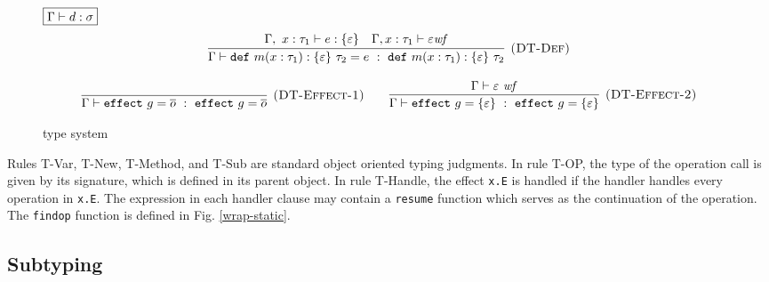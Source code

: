 \documentclass{article}
\newcommand{\keywadj}[1]{\mathtt{#1}}
\newcommand{\keyw}[1]{\keywadj{#1}~}
\begin{document}
\begin{figure}[H]
{\noindent$\fbox{$\Gamma \vdash d : \sigma$}$
\[
\begin{array}{c}
\infer[\textsc{(DT-Def)}]
  {\Gamma \vdash \keyw{def} m(x : \tau_1) : \{ \varepsilon \}~\tau_2 = e~:~\keyw{def} m(x : \tau_1) : \{ \varepsilon \}~\tau_2}
  { \Gamma,~x : \tau_1 \vdash e : \{ \varepsilon \} & \Gamma, x : \tau_1 \vdash \varepsilon \mathit{wf}  }\\[3ex]

\infer[\textsc{(DT-Effect-1)}]
  {\Gamma \vdash \keyw{effect} g = \overline{o} ~:~\keyw{effect} g =  \overline{o} }
  {} \quad \quad 
  
  
\infer[\textsc{(DT-Effect-2)}]
  {\Gamma \vdash \keyw{effect} g = \{ \varepsilon \}~:~\keyw{effect} g = \{ \varepsilon \}}
  {\Gamma \vdash \varepsilon~\mathit{wf}}
 
\end{array}
\]

}
\caption{ type system}
\label{f-declarative}
\end{figure}


Rules T-Var, T-New, T-Method, and T-Sub are standard object oriented typing judgments.  In rule T-OP, the type of the operation call is given by its signature, which is defined in its parent object. In rule T-Handle, the effect \texttt{x.E} is handled if the handler handles every operation in \texttt{x.E}. The expression in each handler clause may contain a \texttt{resume} function which serves as the continuation of the operation.  The \texttt{findop} function is defined in Fig. \ref{wrap-static}.



\subsection{Subtyping} 
\end{document}
